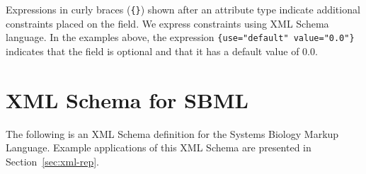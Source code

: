 \documentclass[10pt]{cekarticle}
\begin{document}
Expressions in curly braces (\texttt{\{\}}) shown after an attribute type
indicate additional constraints placed on the field.  We express constraints
using XML Schema language.  In the examples above, the expression
\texttt{\{use="default" value="0.0"\}} indicates that the field 
is optional and that it has a default value of $0.0$.



\section{XML Schema for SBML}
\label{apdx:schemas}

The following is an XML Schema definition for the Systems Biology Markup
Language.  Example applications of this XML Schema are presented in
Section~\ref{sec:xml-rep}.
\end{document}
